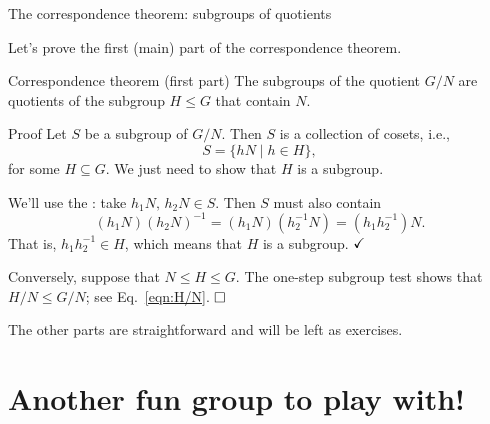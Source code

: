 \documentclass[8pt]{beamer}
\newcommand{\Pause}{}      %
\begin{document}

\begin{frame}{The correspondence theorem: subgroups of quotients} %
  
  Let's prove the first (main) part of the correspondence theorem.
  
  \begin{block}{Correspondence theorem (first part)}
    The subgroups of the quotient $G/N$ are quotients of the
    subgroup $H\leq G$ that contain $N$.
  \end{block}
  
  \begin{exampleblock}{Proof} \pause
    Let $S$ be a subgroup of $G/N$. \Pause Then $S$ is a collection of
    cosets, i.e.,
    \[
    S=\big\{hN\mid h\in H\big\},
    \]
    for some  $H\subseteq G$. \Pause We just need to
    show that $H$ is a subgroup. \medskip\pause

    We'll use the : take
    $h_1N,\,h_2N\in S$. \Pause Then $S$ must also contain
    \begin{equation}\label{eqn:H/N}
    (h_1N)(h_2N)^{-1}=(h_1N)(h_2^{-1}N)=(h_1h_2^{-1})N.
    \end{equation}
    That is, $h_1h_2^{-1}\in H$, which means that $H$ is a
    subgroup. $\hfill\checkmark$ \medskip\pause

    Conversely, suppose that $N\leq H\leq G$. \Pause The one-step subgroup
    test shows that $H/N\leq G/N$; see Eq.~\eqref{eqn:H/N}. $\hfill\Box$
  \end{exampleblock}
  
  \smallskip\Pause
  
  The other parts are straightforward and will be left as exercises.
\end{frame}

\section{Another fun group to play with!}

\end{document}
